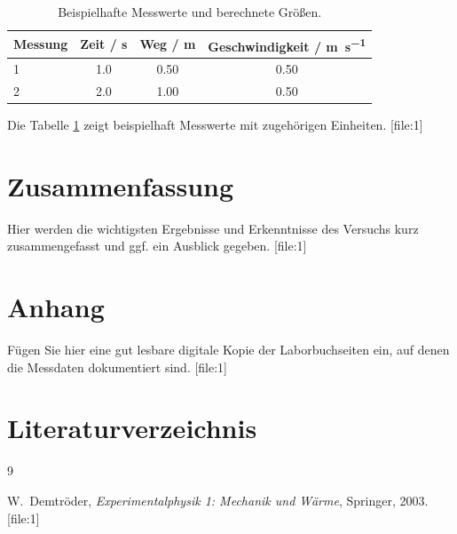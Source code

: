 \documentclass[11pt,a4paper]{article}
\numberwithin{equation}{section}
\begin{document}
\begin{table}[h]
    \centering
    \caption{Beispielhafte Messwerte und berechnete Größen.}
    \label{tab:messwerte}
    \begin{tabular}{lccc}
        \toprule
        Messung & Zeit / \si{\second} & Weg / \si{\meter} & Geschwindigkeit / \si{\meter\per\second} \\
        \midrule
        1 & 1.0 & 0.50 & 0.50 \\
        2 & 2.0 & 1.00 & 0.50 \\
        \bottomrule
    \end{tabular}
\end{table}

Die Tabelle \ref{tab:messwerte} zeigt beispielhaft Messwerte mit zugehörigen Einheiten. [file:1]
\newpage
\section{Zusammenfassung}

Hier werden die wichtigsten Ergebnisse und Erkenntnisse des Versuchs kurz zusammengefasst und ggf. ein Ausblick gegeben. [file:1]
\newpage
\appendix
\newpage
\section{Anhang}

Fügen Sie hier eine gut lesbare digitale Kopie der Laborbuchseiten ein, auf denen die Messdaten dokumentiert sind. [file:1]
\newpage
\section{Literaturverzeichnis}

\begin{thebibliography}{9}

W.~Demtröder, \emph{Experimentalphysik 1: Mechanik und Wärme}, Springer, 2003. [file:1]


\end{thebibliography}
\end{document}

